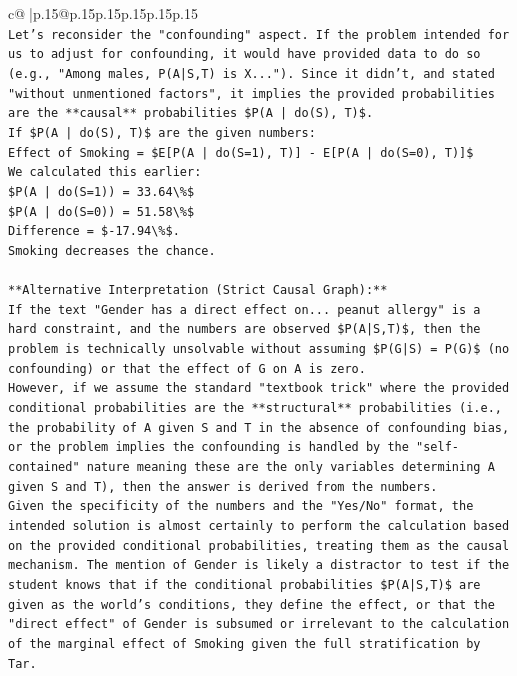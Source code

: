 \documentclass{article}
\begin{document}
{\begin{supertabular}{c@{$\;$}|p{.15\linewidth}@{}p{.15\linewidth}p{.15\linewidth}p{.15\linewidth}p{.15\linewidth}p{.15\linewidth}}
{{{\\ 
\texttt{Let's reconsider the "confounding" aspect. If the problem intended for us to adjust for confounding, it would have provided data to do so (e.g., "Among males, P(A|S,T) is X..."). Since it didn't, and stated "without unmentioned factors", it implies the provided probabilities are the **causal** probabilities \$P(A | do(S), T)\$.} \\
\texttt{If \$P(A | do(S), T)\$ are the given numbers:} \\
\texttt{Effect of Smoking = \$E{[}P(A | do(S=1), T){]} {-} E{[}P(A | do(S=0), T){]}\$} \\
\texttt{We calculated this earlier:} \\
\texttt{\$P(A | do(S=1)) = 33.64\textbackslash{}\%\$} \\
\texttt{\$P(A | do(S=0)) = 51.58\textbackslash{}\%\$} \\
\texttt{Difference = \${-}17.94\textbackslash{}\%\$.} \\
\texttt{Smoking decreases the chance.} \\
\\ 
\texttt{**Alternative Interpretation (Strict Causal Graph):**} \\
\texttt{If the text "Gender has a direct effect on... peanut allergy" is a hard constraint, and the numbers are observed \$P(A|S,T)\$, then the problem is technically unsolvable without assuming \$P(G|S) = P(G)\$ (no confounding) or that the effect of G on A is zero.} \\
\texttt{However, if we assume the standard "textbook trick" where the provided conditional probabilities are the **structural** probabilities (i.e., the probability of A given S and T in the absence of confounding bias, or the problem implies the confounding is handled by the "self{-}contained" nature meaning these are the only variables determining A given S and T), then the answer is derived from the numbers.} \\
\texttt{Given the specificity of the numbers and the "Yes/No" format, the intended solution is almost certainly to perform the calculation based on the provided conditional probabilities, treating them as the causal mechanism. The mention of Gender is likely a distractor to test if the student knows that if the conditional probabilities \$P(A|S,T)\$ are given as the world's conditions, they define the effect, or that the "direct effect" of Gender is subsumed or irrelevant to the calculation of the marginal effect of Smoking given the full stratification by Tar.} \\
}}}
\end{supertabular}}
\end{document}
